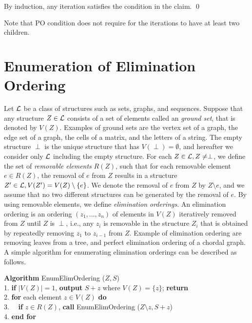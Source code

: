 \documentclass{llncs}
\begin{document}
\noindent
By induction, any iteration satisfies the condition in the claim.
\qed

Note that PO condition does not require for the iterations to have
 at least two children.


\vspace{-2mm}
\section{Enumeration of Elimination Ordering}\label{sec:elim}
\vspace{-2mm}

Let ${\cal L}$ be a class of structures such as sets, graphs, and sequences.
Suppose that any structure $Z\in {\cal L}$ consists of a set of elements
 called an {\em ground set}, that is denoted by $V(Z)$.
Examples of ground sets are the vertex set of a graph, the edge set of 
 a graph, the cells of a matrix, and the letters of a string.
The empty structure $\perp$ is the unique structure that has
 $V(\perp) = \emptyset$, and hereafter we consider only $\cal L$ including 
 the empty structure.
For each $Z\in {\cal L}, Z\ne \perp$, we define the set of 
 {\em removable elements} $R(Z)$, such that for each removable element
 $e\in R(Z)$, the removal of $e$ from $Z$ results in a structure
 $Z'\in {\cal L}, V(Z') = V(Z)\setminus \{ e\}$.
We denote the removal of $e$ from $Z$ by $Z\setminus e$, and we assume that
 no two different structures can be generated by the removal of $e$.
By using removable elements, we define {\em elimination orderings}.
An elimination ordering is an ordering $(z_1,\ldots,z_n)$ of
 elements in $V(Z)$ iteratively removed from $Z$ until $Z$ is $\perp$, i.e.,
 any $z_i$ is removable in the structure $Z_i$ that is obtained by repeatedly 
 removing $z_1$ to $z_{i-1}$ from $Z$.
Example of elimination ordering are removing leaves from a tree,
 and perfect elimination ordering of a chordal graph.
A simple algorithm for enumerating elimination orderings can be described
 as follows.

\begin{tabbing}
{\bf Algorithm} EnumElimOrdering ($Z, S$)\\
1. {\bf if} $|V(Z)| = 1$, {\bf output} $S + z$ where $V(Z) = \{ z\}$;
 {\bf return}\\ 
2. {\bf for} each element $z\in V(Z)$ {\bf do}\\
3. \ \ {\bf if} $z\in R(Z)$, {\bf call} EnumElimOrdering
 ($Z\setminus z, S + z$)\\
4. {\bf end for}
\end{tabbing}
\end{document}
